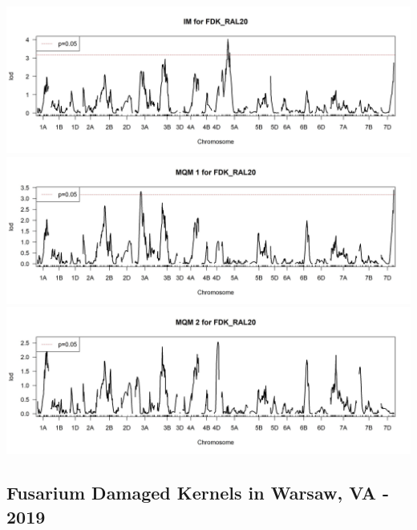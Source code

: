 \documentclass[
]{article}
\begin{document}
\includegraphics{Scan_IM_FDK_RAL20.jpg}
\includegraphics{Scan_MQM1_FDK_RAL20.jpg}
\includegraphics{Scan_MQM2_FDK_RAL20.jpg} \pagebreak

\subsection{Fusarium Damaged Kernels in Warsaw, VA -
2019}\label{fusarium-damaged-kernels-in-warsaw-va---2019}
\end{document}
